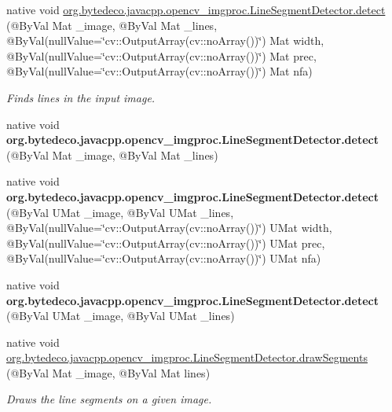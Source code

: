 \begin{DoxyCompactItemize}
native void \hyperlink{group__imgproc_gae1e811b637738b2c10d97ca72abcf5d0}{org.\+bytedeco.\+javacpp.\+opencv\+\_\+imgproc.\+Line\+Segment\+Detector.\+detect} (@By\+Val Mat \+\_\+image, @By\+Val Mat \+\_\+lines, @By\+Val(null\+Value=\char`\"{}cv\+::\+Output\+Array(cv\+::no\+Array())\char`\"{}) Mat width, @By\+Val(null\+Value=\char`\"{}cv\+::\+Output\+Array(cv\+::no\+Array())\char`\"{}) Mat prec, @By\+Val(null\+Value=\char`\"{}cv\+::\+Output\+Array(cv\+::no\+Array())\char`\"{}) Mat nfa)
\begin{DoxyCompactList}\small\item\em Finds lines in the input image. \end{DoxyCompactList}\item 
\mbox{\label{group__imgproc_ga596514aab3f36af17e1c8d134d8d54e4}} 
native void {\bfseries org.\+bytedeco.\+javacpp.\+opencv\+\_\+imgproc.\+Line\+Segment\+Detector.\+detect} (@By\+Val Mat \+\_\+image, @By\+Val Mat \+\_\+lines)
\item 
\mbox{\label{group__imgproc_gac0682f51450a19b1de0831f20cd7a290}} 
native void {\bfseries org.\+bytedeco.\+javacpp.\+opencv\+\_\+imgproc.\+Line\+Segment\+Detector.\+detect} (@By\+Val U\+Mat \+\_\+image, @By\+Val U\+Mat \+\_\+lines, @By\+Val(null\+Value=\char`\"{}cv\+::\+Output\+Array(cv\+::no\+Array())\char`\"{}) U\+Mat width, @By\+Val(null\+Value=\char`\"{}cv\+::\+Output\+Array(cv\+::no\+Array())\char`\"{}) U\+Mat prec, @By\+Val(null\+Value=\char`\"{}cv\+::\+Output\+Array(cv\+::no\+Array())\char`\"{}) U\+Mat nfa)
\item 
\mbox{\label{group__imgproc_ga1f4d914e7f3774f7874877a90bf6f6f7}} 
native void {\bfseries org.\+bytedeco.\+javacpp.\+opencv\+\_\+imgproc.\+Line\+Segment\+Detector.\+detect} (@By\+Val U\+Mat \+\_\+image, @By\+Val U\+Mat \+\_\+lines)
\item 
native void \hyperlink{group__imgproc_ga4034942c41526e2380675e1c0441d63c}{org.\+bytedeco.\+javacpp.\+opencv\+\_\+imgproc.\+Line\+Segment\+Detector.\+draw\+Segments} (@By\+Val Mat \+\_\+image, @By\+Val Mat lines)
\begin{DoxyCompactList}\small\item\em Draws the line segments on a given image. \end{DoxyCompactList}\item 
\mbox{\label{group__imgproc_ga677c9fc59ec637c5ad166d91a2f81d3f}} 

\end{DoxyCompactItemize}
